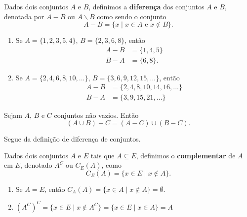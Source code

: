\begin{definicao}
	Dados dois conjuntos $A$ e $B$, definimos a \textbf{diferen{\c c}a} dos conjuntos $A$ e $B$, denotada por $A-B$ ou $A\backslash B$ como sendo o conjunto
	\[
		A - B = \{x \mid x \in A \mbox{ e } x \notin B\}.
	\]
\end{definicao}

\begin{exemplos}
	\begin{enumerate}[label={\arabic*})]
		\item Se $A=\{1,2,3,5,4\}$, $B=\{2,3,6,8\}$, ent\~ao
		\begin{align*}
			A - B &= \{1,4,5\}\\
			B - A &=\{6,8\}.
		\end{align*}
		\item Se $A=\{2,4,6,8,10,...\}$, $B=\{3,6,9,12,15,...\}$, ent\~ao
		\begin{align*}
		 	A - B &= \{2,4,8,10,14,16,...\}\\
		 	B - A &= \{3,9,15,21,...\}
		 \end{align*}
	\end{enumerate}
	
\end{exemplos}

\begin{proposicao}
	Sejam $A$, $B$ e $C$ conjuntos n\~ao vazios. Ent\~ao
	\[(A \cup B) - C = (A - C) \cup (B - C).\]
\end{proposicao}
\begin{prova}
	Segue da defini\c{c}\~ao de diferen\c{c}a de conjuntos.
\end{prova}

\begin{definicao}
Dados dois conjuntos $A$ e $E$ tais que $A\subseteq E$, definimos o \textbf{complementar} de $A$ em $E$, denotado $A^C$ ou $C_E(A)$, como
\[
	C_E(A) = \{ x \in E \mid x \notin A \}.
\]
\end{definicao}

\begin{observacoes}
	\begin{enumerate}[label={\arabic*})]
		\item Se $A = E$, ent{\~a}o $C_A(A) = \{ x \in A \mid x \notin A \} = \emptyset$.
		\item $(A^C)^C = \{x \in E \mid x \notin A^C\} = \{ x \in E \mid x \in A \} = A$
	\end{enumerate}
	
\end{observacoes}

